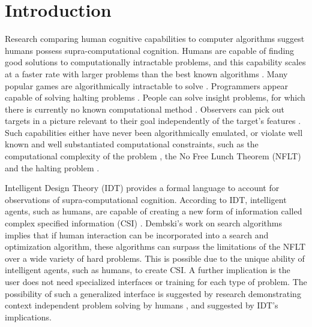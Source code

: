 \section{Introduction}
Research comparing human cognitive capabilities to computer algorithms suggest humans possess supra-computational cognition.  Humans are capable of finding good solutions to computationally intractable problems, and this capability scales at a faster rate with larger problems than the best known algorithms .  Many popular games are algorithmically intractable to solve \citep{viglietta11:_gamin_is_hard_job_but}.  Programmers appear capable of solving halting problems \citep{bartlett11:_calcul_softw_compl_using_haltin_probl}.  People can solve insight problems, for which there is currently no known computational method \citep{bartlett11:_using_turin_oracl_in_cognit_model}.  Observers can pick out targets in a picture relevant to their goal independently of the target's features .  Such capabilities either have never been algorithmically emulated, or violate well known and well substantiated computational constraints, such as the computational complexity of the problem , the No Free Lunch Theorem (NFLT) \citep{wolpert96:_no_free_lunch_theor_for_optim,wolpert95:_no_free_lunch_theor_for_searc} and the halting problem \citep{cover06:_elemen_of_infor_theor}. 

Intelligent Design Theory (IDT) provides a formal language to account for observations of supra-computational cognition.  According to IDT, intelligent agents, such as humans, are capable of creating a new form of information called complex specified information (CSI) \citep{dembski:_specif}. Dembski's work on search algorithms \citep{dembski06:_conser_of_infor_in_searc} implies that if human interaction can be incorporated into a search and optimization algorithm, these algorithms can surpass the limitations of the NFLT  over a wide variety of hard problems.  This is possible due to the unique ability of intelligent agents, such as humans, to create CSI.  A further implication is the user does not need specialized interfaces or training for each type of problem.  The possibility of such a generalized interface is suggested by research demonstrating context independent problem solving by humans , and suggested by IDT's implications.

